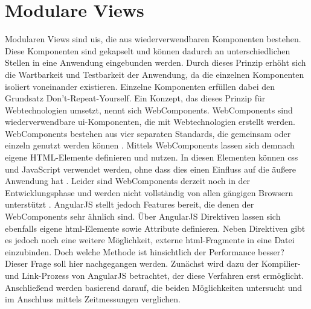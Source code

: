 \section{Modulare Views}
\label{mv-main}

Modularen Views sind \glspl{ui}, die aus wiederverwendbaren Komponenten bestehen. Diese Komponenten sind gekapselt und können dadurch an unterschiedlichen Stellen in eine Anwendung eingebunden werden. Durch dieses Prinzip erhöht sich die Wartbarkeit und Testbarkeit der Anwendung, da die einzelnen Komponenten isoliert voneinander existieren. Einzelne Komponenten erfüllen dabei den Grundsatz \glqq Don't-Repeat-Yourself\grqq{}. Ein Konzept, das dieses Prinzip für Webtechnologien umsetzt, nennt sich WebComponents. WebComponents sind wiederverwendbare \gls{ui}-Komponenten, die mit Webtechnologien erstellt werden. WebComponents bestehen aus vier separaten Standards, die gemeinsam oder einzeln genutzt werden können \cite{WebComponentsStandards}. Mittels WebComponents lassen sich demnach eigene HTML-Elemente definieren und nutzen. In diesen Elementen können \gls{css} und JavaScript verwendet werden, ohne dass dies einen Einfluss auf die äußere Anwendung hat \cite{WebComponents}. Leider sind WebComponents derzeit noch in der Entwicklungsphase und werden nicht vollständig von allen gängigen Browsern unterstützt \cite{WebComponentsVerfuegbarkeit}. AngularJS stellt jedoch Features bereit, die denen der WebComponents sehr ähnlich sind. Über AngularJS Direktiven lassen sich ebenfalls eigene \gls{html}-Elemente sowie Attribute definieren. Neben Direktiven gibt es jedoch noch eine weitere Möglichkeit, externe \gls{html}-Fragmente in eine Datei einzubinden. Doch welche Methode ist hinsichtlich der Performance besser? Dieser Frage soll hier nachgegangen werden. Zunächst wird dazu der Kompilier- und Link-Prozess von AngularJS betrachtet, der diese Verfahren erst ermöglicht. Anschließend werden basierend darauf, die beiden Möglichkeiten untersucht und im Anschluss mittels Zeitmessungen verglichen. 

